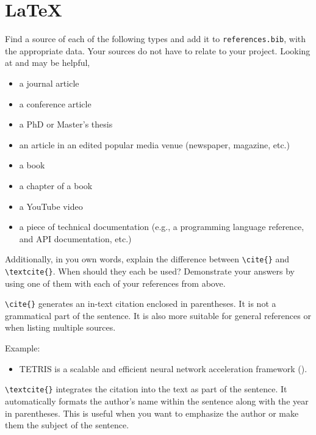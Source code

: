 \documentclass[10pt,twocolumn]{article}
\begin{document}
\section{\LaTeX}

Find a source of each of the following types and add it to \texttt{references.bib}, with the appropriate data. Your sources do not have to relate to your project. Looking at \textcite{OverleafBibliographyManagement} and \textcite{WikipediaBibtex} may be helpful,

\begin{itemize}
\item a journal article
\item a conference article
\item a PhD or Master's thesis
\item an article in an edited popular media venue (newspaper, magazine, etc.)
\item a book
\item a chapter of a book
\item a YouTube video
\item a piece of technical documentation (e.g., a programming language reference, and API documentation, etc.)
\end{itemize}

Additionally, in you own words, explain the difference between \texttt{{\textbackslash}cite\{\}} and \texttt{{\textbackslash}textcite\{\}}. When should they each be used? Demonstrate your answers by using one of them with each of your references from above.

\texttt{{\textbackslash}cite\{\}} generates an in-text citation enclosed in parentheses. It is not a grammatical part of the sentence. It is also more suitable for general references or when listing multiple sources.

Example:
\begin{itemize}
    \item 
    TETRIS is a scalable and efficient neural network acceleration framework (\cite{GaoTetris2017}).
\end{itemize}

\texttt{{\textbackslash}textcite\{\}} integrates the citation into the text as part of the sentence. It automatically formats the author's name within the sentence along with the year in parentheses. This is useful when you want to emphasize the author or make them the subject of the sentence.
\end{document}
